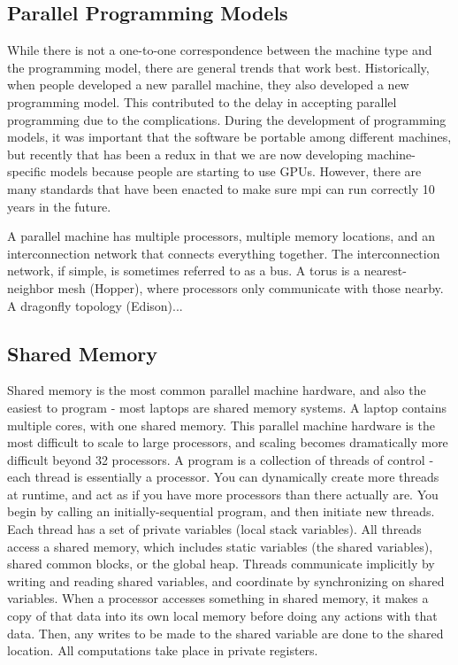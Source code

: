 \documentclass[10pt]{article}
\begin{document}
\begin{flushleft}
\section{Parallel Programming Models}

While there is not a one-to-one correspondence between the machine type and the programming model, there are general trends that work best. Historically, when people developed a new parallel machine, they also developed a new programming model. This contributed to the delay in accepting parallel programming due to the complications. During the development of programming models, it was important that the software be portable among different machines, but recently that has been a redux in that we are now developing machine-specific models because people are starting to use GPUs. However, there are many standards that have been enacted to make sure \gls{mpi} can run correctly 10 years in the future.  

A parallel machine has multiple processors, multiple memory locations, and an interconnection network that connects everything together. The interconnection network, if simple, is sometimes referred to as a bus. A torus is a nearest-neighbor mesh (Hopper), where processors only communicate with those nearby. A dragonfly topology (Edison)...

\subsection{Shared Memory}

Shared memory is the most common parallel machine hardware, and also the easiest to program - most laptops are shared memory systems. A laptop contains multiple cores, with one shared memory. This parallel machine hardware is the most difficult to scale to large processors, and scaling becomes dramatically more difficult beyond 32 processors. A program is a collection of threads of control - each thread is essentially a processor. You can dynamically create more threads at runtime, and act as if you have more processors than there actually are. You begin by calling an initially-sequential program, and then initiate new threads. Each thread has a set of private variables (local stack variables). All threads access a shared memory, which includes static variables (the shared variables), shared common blocks, or the global heap. Threads communicate implicitly by writing and reading shared variables, and coordinate by synchronizing on shared variables. When a processor accesses something in shared memory, it makes a copy of that data into its own local memory before doing any actions with that data. Then, any writes to be made to the shared variable are done to the shared location. All computations take place in private registers.


\end{flushleft}
\end{document}
